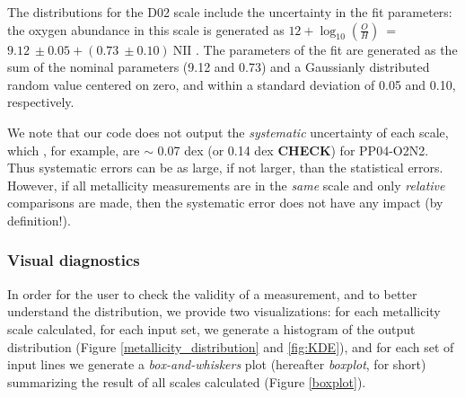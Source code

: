 \documentclass{emulateapj}
\newcommand{\oxab}{\ensuremath{12 + \log_{10}(\frac{O}{H})}}
\begin{document}
The distributions for the D02 scale include the uncertainty in the fit parameters: the oxygen abundance in this scale is generated as \oxab~=~$9.12~\pm 0.05 + (0.73~\pm 0.10)~\mathrm{NII}$ \citep{denicolo02}. The parameters of the fit are generated as the sum of the nominal parameters (9.12 and 0.73) and a Gaussianly distributed random value centered on zero, and within a standard deviation of 0.05 and 0.10, respectively.

We note that our code  does not output the \emph{systematic} uncertainty of each scale, which , for example, are $\sim$ 0.07 dex (or 0.14 dex \textbf{CHECK}) for PP04-O2N2.  Thus systematic errors can be as large, if not larger, than the statistical errors. However, if all metallicity measurements are in the \emph{same} scale and only \emph{relative} comparisons are made, then the systematic error does not have any impact (by definition!). 



\subsubsection{Visual diagnostics}\label{vizs}
In order for the user to check the validity of a measurement, and to better understand the distribution, we provide two visualizations: for each metallicity scale calculated, for each input set, we generate a histogram of the output distribution (Figure \ref{metallicity_distribution} and \ref{fig:KDE}), and for each set of input lines we generate a \emph{box-and-whiskers} plot (hereafter \emph{boxplot}, for short) summarizing the result of all scales calculated (Figure \ref{boxplot}). 
\end{document}
